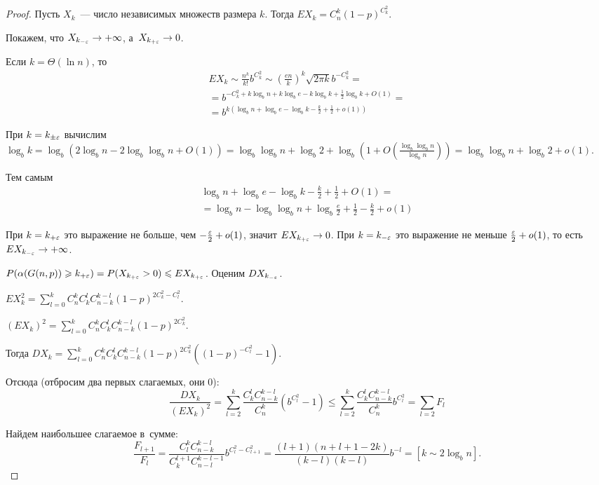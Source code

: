\documentclass{article}
\begin{document}
\begin{proof}
	Пусть $X_k$~--- число независимых множеств размера $k$. Тогда $EX_k = C_n^k (1 - p)^{C_k^2}$.

	Покажем, что $X_{k_{-\varepsilon}} \rightarrow +\infty$, а~$X_{k_{+\varepsilon}} \rightarrow 0$.

	Если $k = \Theta(\ln n)$, то
	\begin{multline*}
		EX_k \sim \frac{n^k}{k!} b^{C_k^2} \sim \left( \frac{en}{k} \right)^k \sqrt{2\pi k} b^{-C_k^2}
		=\\= b^{-C_k^2 + k \log_b n + k \log_b e - k \log_b k + \frac{1}{2} \log_b k + O(1)} =\\=
		b^{k(\log_b n + \log_b e - \log_b k - \frac{k}{2} + \frac{1}{2} + o(1))}
	\end{multline*}

	При $k = k_{\pm \varepsilon}$ вычислим $\log_b k = \log_b(2 \log_b n - 2\log_b \log_b n + O(1)) =
	\log_b \log_b n + \log_b 2 + \log_b(1 + O(\frac{\log_b \log_b n}{\log_b n})) = \log_b \log_b n +
	\log_b 2 + o(1)$.

	Тем самым
	\begin{multline*}
		\log_b n + \log_b e - \log_b k - \frac{k}{2} + \frac{1}{2} + O(1) =\\= \log_b n - \log_b \log_b
		n + \log_b \frac{e}{2} + \frac{1}{2} - \frac{k}{2} + o(1)
	\end{multline*}

	При $k = k_{+\varepsilon}$ это выражение не больше, чем $-\frac{\varepsilon}{2} + o(1)$, значит $EX_{k_{+\varepsilon}}
	\rightarrow 0$. При $k = k_{-\varepsilon}$ это выражение не меньше $\frac{\varepsilon}{2} + o(1)$, то есть $E
	X_{k_{-\varepsilon}} \rightarrow +\infty$.

	$P(\alpha(G(n,p)) \geqslant k_{+\varepsilon}) = P(X_{k_{+\varepsilon}} > 0) \leqslant EX_{k_{+\varepsilon}}$. Оценим
	$DX_{k_{-\varepsilon}}$.

	$EX_k^2 = \sum\limits_{l=0}^k C_n^k C_k^l C_{n-k}^{k-l} (1-p)^{2C_k^2 - C_l^2}$.

	$(EX_k)^2 = \sum\limits_{l=0}^k C_n^k C_k^l C_{n-k}^{k-l} (1-p)^{2C_k^2}$.

	Тогда $DX_k = \sum\limits_{l=0}^k C_n^k C_k^l C_{n-k}^{k-l} (1-p)^{2C_k^2} ((1 - p)^{-C_l^2} -
	1)$.

	Отсюда (отбросим два первых слагаемых, они 0):
	$$
		\frac{DX_k}{(EX_k)^2} = \sum\limits_{l=2}^k \frac{C_k^l C_{n-k}^{k-l}}{C_n^k} (b^{C_l^2} - 1)
		\le \sum\limits_{l=2}^k \frac{C_k^l C_{n-k}^{k-l}}{C_n^k} b^{C_l^2} = \sum\limits_{l=2} F_l
	$$

	Найдем наибольшее слагаемое в~сумме:
	$$
		\frac{F_{l+1}}{F_l} = \frac{C_l^k C_{n-k}^{k-l}}{C_k^{l+1} C_{n-l}^{k-l-1}} b^{C_l^2 -
		C_{l+1}^2} = \frac{(l+1)(n + l + 1 - 2k)}{(k-l)(k - l)} b^{-l} = [k \sim 2 \log_b n].
	$$


\end{proof}
\end{document}
